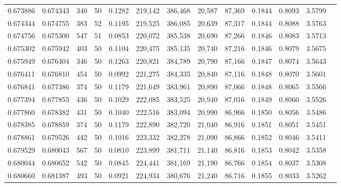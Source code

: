 \begin{tabular}{rrrrrrrrrrrrr}
0.673886 & 0.674343 &   340 &  50 &                                     0.1282 & 219,142 & 386,468 &  20,587 &  87,369 & 0.1844 & 0.8093 & 3.5799 \\
0.674344 & 0.674755 &   383 &  52 &                                     0.1195 & 219,525 & 386,085 &  20,639 &  87,317 & 0.1844 & 0.8088 & 3.5763 \\
0.674756 & 0.675300 &   547 &  51 &                                     0.0853 & 220,072 & 385,538 &  20,690 &  87,266 & 0.1846 & 0.8083 & 3.5713 \\
0.675302 & 0.675942 &   403 &  50 &                                     0.1104 & 220,475 & 385,135 &  20,740 &  87,216 & 0.1846 & 0.8079 & 3.5675 \\
0.675949 & 0.676404 &   346 &  50 &                                     0.1263 & 220,821 & 384,789 &  20,790 &  87,166 & 0.1847 & 0.8074 & 3.5643 \\
0.676411 & 0.676810 &   454 &  50 &                                     0.0992 & 221,275 & 384,335 &  20,840 &  87,116 & 0.1848 & 0.8070 & 3.5601 \\
0.676841 & 0.677386 &   374 &  50 &                                     0.1179 & 221,649 & 383,961 &  20,890 &  87,066 & 0.1848 & 0.8065 & 3.5566 \\
0.677394 & 0.677855 &   436 &  50 &                                     0.1029 & 222,085 & 383,525 &  20,940 &  87,016 & 0.1849 & 0.8060 & 3.5526 \\
0.677860 & 0.678382 &   431 &  50 &                                     0.1040 & 222,516 & 383,094 &  20,990 &  86,966 & 0.1850 & 0.8056 & 3.5486 \\
0.678385 & 0.678859 &   374 &  50 &                                     0.1179 & 222,890 & 382,720 &  21,040 &  86,916 & 0.1851 & 0.8051 & 3.5451 \\
0.678861 & 0.679526 &   442 &  50 &                                     0.1016 & 223,332 & 382,278 &  21,090 &  86,866 & 0.1852 & 0.8046 & 3.5411 \\
0.679529 & 0.680043 &   567 &  50 &                                     0.0810 & 223,899 & 381,711 &  21,140 &  86,816 & 0.1853 & 0.8042 & 3.5358 \\
0.680044 & 0.680652 &   542 &  50 &                                     0.0845 & 224,441 & 381,169 &  21,190 &  86,766 & 0.1854 & 0.8037 & 3.5308 \\
0.680660 & 0.681387 &   493 &  50 &                                     0.0921 & 224,934 & 380,676 &  21,240 &  86,716 & 0.1855 & 0.8033 & 3.5262 \\

\end{tabular}
